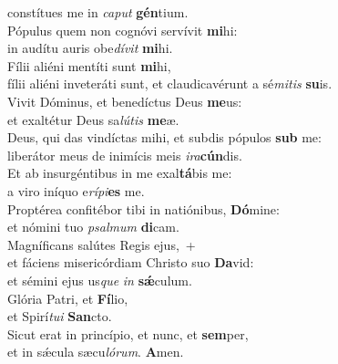 \oddverse constítues me in \textit{ca}\textit{put} \textbf{gén}tium.\\
\evenverse Pópulus quem non cognóvi servívit \textbf{mi}hi:~\*\\
\evenverse in audítu auris obe\textit{dí}\textit{vit} \textbf{mi}hi.\\
\oddverse Fílii aliéni mentíti sunt \textbf{mi}hi,~\*\\
\oddverse fílii aliéni inveteráti sunt, et claudicavérunt a sé\textit{mi}\textit{tis} \textbf{su}is.\\
\evenverse Vivit Dóminus, et benedíctus Deus \textbf{me}us:~\*\\
\evenverse et exaltétur Deus sa\textit{lú}\textit{tis} \textbf{me}æ.\\
\oddverse Deus, qui das vindíctas mihi, et subdis pópulos \textbf{sub} me:~\*\\
\oddverse liberátor meus de inimícis meis \textit{i}\textit{ra}\textbf{cún}dis.\\
\evenverse Et ab insurgéntibus in me exal\textbf{tá}bis me:~\*\\
\evenverse a viro iníquo e\textit{rí}\textit{pi}\textbf{es} me.\\
\oddverse Proptérea confitébor tibi in natiónibus, \textbf{Dó}mine:~\*\\
\oddverse et nómini tuo \textit{psal}\textit{mum} \textbf{di}cam.\\
\evenverse Magníficans salútes Regis ejus,~+\\
\evenverse  et fáciens misericórdiam Christo suo \textbf{Da}vid:~\*\\
\evenverse et sémini ejus us\textit{que} \textit{in} \textbf{sǽ}culum.\\
\oddverse Glória Patri, et \textbf{Fí}lio,~\*\\
\oddverse et Spirí\textit{tu}\textit{i} \textbf{San}cto.\\
\evenverse Sicut erat in princípio, et nunc, et \textbf{sem}per,~\*\\
\evenverse et in sǽcula sæcu\textit{ló}\textit{rum}. \textbf{A}men.\\
